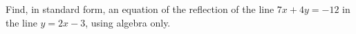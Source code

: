 Find, in standard form, an equation of the reflection of the line $7x+4y=-12$ in the line $y=2x-3$, using algebra only.
